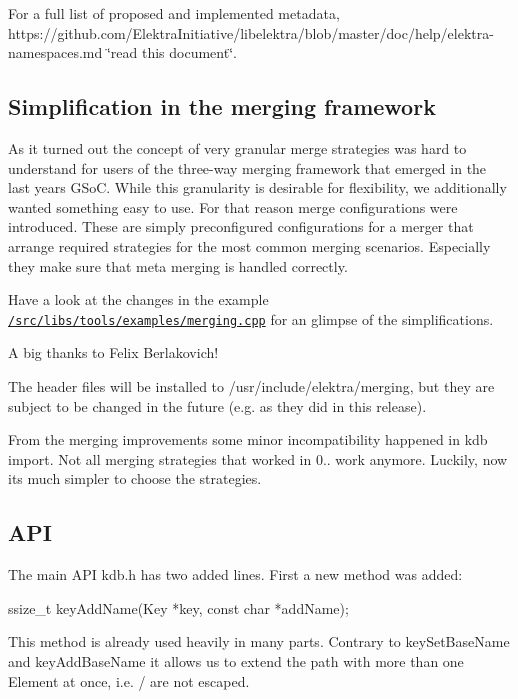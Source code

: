 For a full list of proposed and implemented metadata, https\+://github.com/\+Elektra\+Initiative/libelektra/blob/master/doc/help/elektra-\/namespaces.\+md \char`\"{}read this document\char`\"{}.

\subsection*{Simplification in the merging framework}

As it turned out the concept of very granular merge strategies was hard to understand for users of the three-\/way merging framework that emerged in the last year\textquotesingle{}s G\+SoC. While this granularity is desirable for flexibility, we additionally wanted something easy to use. For that reason merge configurations were introduced. These are simply preconfigured configurations for a merger that arrange required strategies for the most common merging scenarios. Especially they make sure that meta merging is handled correctly.

Have a look at the changes in the example \href{https://github.com/ElektraInitiative/libelektra/blob/master/src/libs/tools/examples/merging.cpp}{\tt /src/libs/tools/examples/merging.cpp} for an glimpse of the simplifications.

A big thanks to Felix Berlakovich!

The header files will be installed to /usr/include/elektra/merging, but they are subject to be changed in the future (e.\+g. as they did in this release).

From the merging improvements some minor incompatibility happened in {\ttfamily kdb import}. Not all merging strategies that worked in 0.. work anymore. Luckily, now its much simpler to choose the strategies.

\subsection*{A\+PI}

The main A\+PI kdb.\+h has two added lines. First a new method was added\+: \begin{DoxyVerb}ssize_t keyAddName(Key *key, const char *addName);
\end{DoxyVerb}


This method is already used heavily in many parts. Contrary to {\ttfamily key\+Set\+Base\+Name} and {\ttfamily key\+Add\+Base\+Name} it allows us to extend the path with more than one Element at once, i.\+e. {\ttfamily /} are not escaped.

